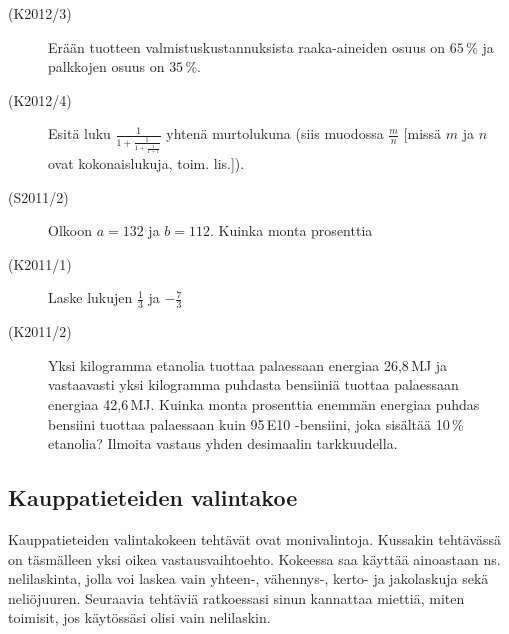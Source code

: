 \begin{description}
	\item[(K2012/3)] Erään tuotteen valmistuskustannuksista raaka-aineiden osuus on $65$\,\% ja palkkojen osuus on $35$\,\%.
        

	\item[(K2012/4)] Esitä luku $\frac{1}{1+\frac{1}{1+\frac{1}{1+1}}}$ yhtenä murtolukuna (siis muodossa $\frac{m}{n}$ [missä $m$ ja $n$ ovat kokonaislukuja, toim. lis.]).
	\item[(S2011/2)] Olkoon $a=132$ ja  $b=112$. Kuinka monta prosenttia 
	\item[(K2011/1)] Laske lukujen $\frac{1}{3}$ ja $-\frac{7}{3}$
	\item[(K2011/2)] Yksi kilogramma etanolia tuottaa palaessaan energiaa 26,8\,MJ
        ja vastaavasti yksi kilogramma puhdasta bensiiniä tuottaa palaessaan energiaa
        42,6\,MJ. Kuinka monta prosenttia enemmän energiaa puhdas bensiini tuottaa
        palaessaan kuin 95\,E10 -bensiini, joka sisältää 10\,\% etanolia? Ilmoita
        vastaus yhden desimaalin tarkkuudella. 
\end{description}

\subsection*{Kauppatieteiden valintakoe}

Kauppatieteiden valintakokeen tehtävät ovat monivalintoja. Kussakin tehtävässä on täsmälleen yksi oikea vastausvaihtoehto. Kokeessa saa käyttää ainoastaan ns. nelilaskinta, jolla voi laskea vain yhteen-, vähennys-, kerto- ja jakolaskuja sekä neliöjuuren. Seuraavia tehtäviä ratkoessasi sinun kannattaa miettiä, miten toimisit, jos käytössäsi olisi vain nelilaskin.

